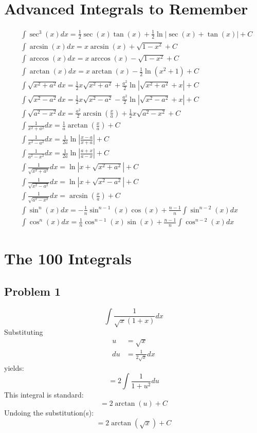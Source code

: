 \documentclass{article}
\begin{document}
\section{Advanced Integrals to Remember}
\begin{align*}
&\int\sec^3(x)dx=\frac{1}{2}\sec(x)\tan(x)+\frac{1}{2}\ln\left|\sec(x)+\tan(x)\right|+C \\
&\int\arcsin(x)dx=x\arcsin(x)+\sqrt{1-x^2}+C \\
&\int\arccos(x)dx=x\arccos(x)-\sqrt{1-x^2}+C \\
&\int\arctan(x)dx=x\arctan(x)-\frac{1}{2}\ln(x^2+1)+C \\
&\int\sqrt{x^2+a^2}dx=\frac{1}{2}x\sqrt{x^2+a^2}+\frac{a^2}{2}\ln\left|\sqrt{x^2+a^2}+x\right|+C \\
&\int\sqrt{x^2-a^2}dx=\frac{1}{2}x\sqrt{x^2-a^2}-\frac{a^2}{2}\ln\left|\sqrt{x^2-a^2}+x\right|+C \\
&\int\sqrt{a^2-x^2}dx=\frac{a^2}{2}\arcsin\left(\frac{x}{a}\right)+\frac{1}{2}x\sqrt{a^2-x^2}+C \\
&\int\frac{1}{x^2+a^2}dx=\frac{1}{a}\arctan\left(\frac{x}{a}\right)+C \\
&\int\frac{1}{x^2-a^2}dx=\frac{1}{2a}\ln\left|\frac{x-a}{x+a}\right|+C \\
&\int\frac{1}{a^2-x^2}dx=\frac{1}{2a}\ln\left|\frac{a+x}{a-x}\right|+C \\
&\int\frac{1}{\sqrt{x^2+a^2}}dx=\ln\left|x+\sqrt{x^2+a^2}\right|+C \\
&\int\frac{1}{\sqrt{x^2-a^2}}dx=\ln\left|x+\sqrt{x^2-a^2}\right|+C \\
&\int\frac{1}{\sqrt{a^2-x^2}}dx=\arcsin\left(\frac{x}{a}\right)+C \\
&\int\sin^n(x)dx=-\frac{1}{n}\sin^{n-1}(x)\cos(x)+\frac{n-1}{n}\int\sin^{n-2}(x)dx \\
&\int\cos^n(x)dx=\frac{1}{n}\cos^{n-1}(x)\sin(x)+\frac{n-1}{n}\int\cos^{n-2}(x)dx
\end{align*}
\newpage
\section{The 100 Integrals}
\subsection*{Problem 1}
$$\int\frac{1}{\sqrt{x}\left(1+x\right)}dx$$
Substituting
\begin{align*}
u&=\sqrt{x} \\
du&=\frac{1}{2\sqrt{x}}dx
\end{align*}
yields:
$$=2\int\frac{1}{1+u^2}du$$
This integral is standard:
$$=2\arctan(u)+C$$
Undoing the substitution(s):
$$=2\arctan\left(\sqrt{x}\right)+C$$
\end{document}

